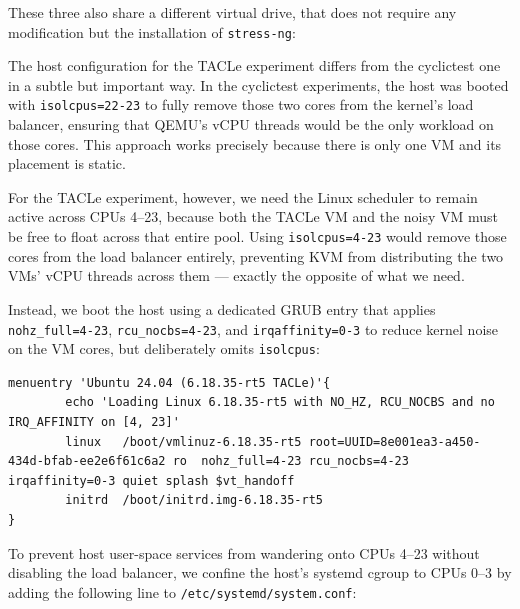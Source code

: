 These three also share a different virtual drive, that does not require
any modification but the installation of \texttt{stress-ng}:

\begin{Shaded}
\begin{Highlighting}[]
\end{Highlighting}
\end{Shaded}

The host configuration for the TACLe experiment differs from the
cyclictest one in a subtle but important way. In the cyclictest
experiments, the host was booted with \texttt{isolcpus=22-23} to fully
remove those two cores from the kernel's load balancer, ensuring that
QEMU's vCPU threads would be the only workload on those cores. This
approach works precisely because there is only one VM and its placement
is static.

For the TACLe experiment, however, we need the Linux scheduler to remain
active across CPUs 4--23, because both the TACLe VM and the noisy VM
must be free to float across that entire pool. Using
\texttt{isolcpus=4-23} would remove those cores from the load balancer
entirely, preventing KVM from distributing the two VMs' vCPU threads
across them --- exactly the opposite of what we need.

Instead, we boot the host using a dedicated GRUB entry that applies
\texttt{nohz\_full=4-23}, \texttt{rcu\_nocbs=4-23}, and
\texttt{irqaffinity=0-3} to reduce kernel noise on the VM cores, but
deliberately omits \texttt{isolcpus}:

\begin{Verbatim}[breaklines=true,breakanywhere=true]
menuentry 'Ubuntu 24.04 (6.18.35-rt5 TACLe)'{
        echo 'Loading Linux 6.18.35-rt5 with NO_HZ, RCU_NOCBS and no IRQ_AFFINITY on [4, 23]'
        linux   /boot/vmlinuz-6.18.35-rt5 root=UUID=8e001ea3-a450-434d-bfab-ee2e6f61c6a2 ro  nohz_full=4-23 rcu_nocbs=4-23 irqaffinity=0-3 quiet splash $vt_handoff
        initrd  /boot/initrd.img-6.18.35-rt5
}
\end{Verbatim}

To prevent host user-space services from wandering onto CPUs 4--23
without disabling the load balancer, we confine the host's systemd
cgroup to CPUs 0--3 by adding the following line to
\texttt{/etc/systemd/system.conf}:

\begin{Shaded}
\begin{Highlighting}[]
\OtherTok{=}
\end{Highlighting}
\end{Shaded}

